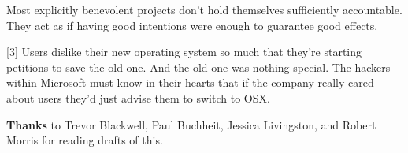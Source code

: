 Most explicitly benevolent
                  projects don't hold themselves sufficiently accountable. They
                  act as if having good intentions were enough to guarantee good
                  effects.

[3] Users dislike their new operating system so much that
                  they're starting petitions to save the old one. And the old
                  one was nothing special. The hackers within Microsoft must
                  know in their hearts that if the company really cared about
                  users they'd just advise them to switch to OSX.

\textbf{Thanks}
                  to Trevor Blackwell, Paul Buchheit, Jessica Livingston, and
                  Robert Morris for reading drafts of this.





              
            
          
